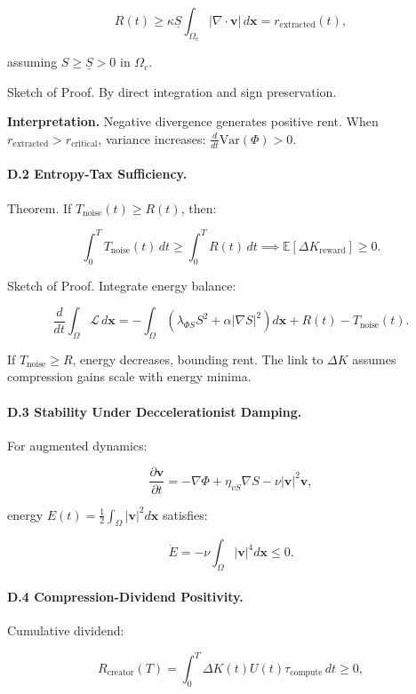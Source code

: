 \documentclass[12pt]{article}
\begin{document}
\[
R(t) \geq \kappa \underline{S} \int_{\Omega_c} |\nabla \cdot \mathbf{v}| \, d\mathbf{x} = r_{\text{extracted}}(t),
\]

assuming \( S \geq \underline{S} > 0 \) in \(\Omega_c\).

Sketch of Proof. By direct integration and sign preservation.

\textbf{Interpretation.} Negative divergence generates positive rent. When \( r_{\text{extracted}} > r_{\text{critical}} \), variance increases: \(\frac{d}{dt} \text{Var}(\Phi) > 0\).

\paragraph{D.2 Entropy-Tax Sufficiency.}

Theorem. If \( T_{\text{noise}}(t) \geq R(t) \), then:

\[
\int_0^T T_{\text{noise}}(t) \, dt \geq \int_0^T R(t) \, dt \implies \mathbb{E}[\Delta K_{\text{reward}}] \geq 0.
\]

Sketch of Proof. Integrate energy balance:

\[
\frac{d}{dt} \int_\Omega \mathcal{L} \, d\mathbf{x} = - \int_\Omega (\lambda_{\Phi S} S^2 + \alpha |\nabla S|^2) d\mathbf{x} + R(t) - T_{\text{noise}}(t).
\]

If \( T_{\text{noise}} \geq R \), energy decreases, bounding rent. The link to \(\Delta K\) assumes compression gains scale with energy minima.

\paragraph{D.3 Stability Under Deccelerationist Damping.}

For augmented dynamics:

\[
\frac{\partial \mathbf{v}}{\partial t} = -\nabla \Phi + \eta_{vS} \nabla S - \nu |\mathbf{v}|^2 \mathbf{v},
\]

energy \( E(t) = \tfrac{1}{2} \int_\Omega |\mathbf{v}|^2 d\mathbf{x} \) satisfies:

\[
\dot{E} = - \nu \int_\Omega |\mathbf{v}|^4 d\mathbf{x} \leq 0.
\]

\paragraph{D.4 Compression-Dividend Positivity.}

Cumulative dividend:

\[
R_{\text{creator}}(T) = \int_0^T \Delta K(t) U(t) \tau_{\text{compute}} \, dt \geq 0,
\]
\end{document}
